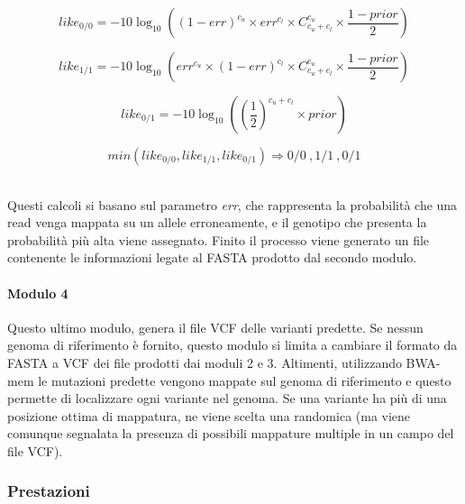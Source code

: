 \documentclass[../main.tex]{subfiles}
\begin{document}
\begin{equation}
like_{0/0} = -10\log_{10}{\left( (1-err)^{c_u} \times err^{c_l} \times C^{c_u}_{c_u + c_l} \times \frac{1-prior}{2} \right)}
\end{equation}

\begin{equation}
like_{1/1} = -10\log_{10}{\left( err^{c_u} \times (1-err)^{c_l} \times C^{c_u}_{c_u + c_l} \times \frac{1-prior}{2} \right)}
\end{equation}

\begin{equation}
like_{0/1} = -10\log_{10}{\left( \left(\frac{1}{2}\right)^{c_u + c_l} \times prior \right)}
\end{equation}

\begin{equation}
min\left( like_{0/0},like_{1/1},like_{0/1} \right) \Rightarrow 0/0\ ,1/1\ ,0/1
\end{equation}

\noindent
\\
Questi calcoli si basano sul parametro \textit{err}, che rappresenta la probabilità che una read venga mappata su un allele erroneamente, e il genotipo che presenta la probabilità più alta viene assegnato. Finito il processo viene generato un file contenente le informazioni legate al FASTA prodotto dal secondo modulo.

\paragraph{Modulo 4} Questo ultimo modulo, genera il file VCF delle varianti predette. Se nessun genoma di riferimento è fornito, questo modulo si limita a cambiare il formato da FASTA a VCF dei file prodotti dai moduli 2 e 3. Altimenti, utilizzando BWA-mem le mutazioni predette vengono mappate sul genoma di riferimento e questo permette di localizzare ogni variante nel genoma. Se una variante ha più di una posizione ottima di mappatura, ne viene scelta una randomica (ma viene comunque segnalata la presenza di possibili mappature multiple in un campo del file VCF).

\subsubsection{Prestazioni}
\end{document}
